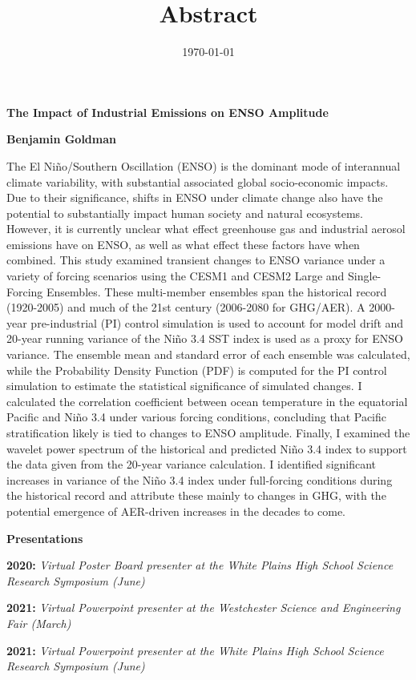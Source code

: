 \documentclass[11pt]{article}
\date{\today}
\title{Abstract}
\begin{document}
\begin{center}
\textbf{The Impact of Industrial Emissions on ENSO Amplitude}

\textbf{Benjamin Goldman}
\end{center}

The El Niño/Southern Oscillation (ENSO) is the dominant mode of interannual climate variability, with substantial associated global socio-economic impacts. Due to their significance, shifts in ENSO under climate change also have the potential to substantially impact human society and natural ecosystems. However, it is currently unclear what effect greenhouse gas and industrial aerosol emissions have on ENSO, as well as what effect these factors have when combined. This study examined transient changes to ENSO variance under a variety of forcing scenarios using the CESM1 and CESM2 Large and Single-Forcing Ensembles. These multi-member ensembles span the historical record (1920-2005) and much of the 21st century (2006-2080 for GHG/AER). A 2000-year pre-industrial (PI) control simulation is used to account for model drift and 20-year running variance of the Niño 3.4 SST index is used as a proxy for ENSO variance. The ensemble mean and standard error of each ensemble was calculated, while the Probability Density Function (PDF) is computed for the PI control simulation to estimate the statistical significance of simulated changes. I calculated the correlation coefficient between ocean temperature in the equatorial Pacific and Niño 3.4 under various forcing conditions, concluding that Pacific stratification likely is tied to changes to ENSO amplitude. Finally, I examined the wavelet power spectrum of the historical and predicted Niño 3.4 index to support the data given from the 20-year variance calculation. I identified significant increases in variance of the Niño 3.4 index under full-forcing conditions during the historical record and attribute these mainly to changes in GHG, with the potential emergence of AER-driven increases in the decades to come.

\begin{center}
\textbf{Presentations}
\end{center}

\textbf{2020:} \emph{Virtual Poster Board presenter at the White Plains High School Science Research Symposium (June)}

\textbf{2021:} \emph{Virtual Powerpoint presenter at the Westchester Science and Engineering Fair (March)}

\textbf{2021:} \emph{Virtual Powerpoint presenter at the White Plains High School Science Research Symposium (June)}
\end{document}
